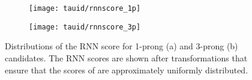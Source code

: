\begin{figure}[htbp]
  \centering

  \begin{subfigure}{0.498\textwidth}
    \texttt{[image: tauid/rnnscore\_1p]}
    \subcaption{}
  \end{subfigure}\hfill%
  \begin{subfigure}{0.498\textwidth}
    \texttt{[image: tauid/rnnscore\_3p]}
    \subcaption{}
  \end{subfigure}

  \caption[Distributions of the RNN score for 1-prong and 3-prong \tauhadvis
  candidates.]{Distributions of the RNN score for 1-prong (a) and 3-prong (b)
    \tauhadvis candidates. The RNN scores are shown after transformations that
    ensure that the scores of \truetauhadvis are approximately uniformly
    distributed.}%
  \label{fig:flattened_rnnscore}
\end{figure}


